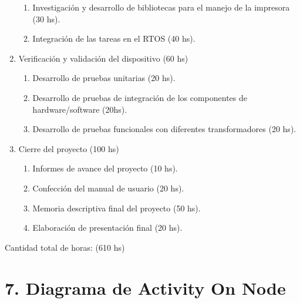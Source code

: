 \documentclass[11pt]{charter}
\begin{document}
\begin{enumerate}
\begin{enumerate}
	\item Investigación y desarrollo de bibliotecas para el manejo de la impresora (30 hs).
	\item Integración de las tareas en el RTOS (40 hs).
	\end{enumerate}
\item Verificación y validación del dispositivo (60 hs)
	\begin{enumerate}
	\item Desarrollo de pruebas unitarias (20 hs).
	\item Desarrollo de pruebas de integración de los componentes de hardware/software (20hs).
	\item Desarrollo de pruebas funcionales con diferentes transformadores (20 hs).
	\end{enumerate}
\item Cierre del proyecto (100 hs)
	\begin{enumerate}
	\item  Informes de avance del proyecto (10 hs).
	\item  Confección del manual de usuario (20 hs).
	\item  Memoria descriptiva final del proyecto (50 hs).
	\item  Elaboración de presentación final (20 hs).
	\end{enumerate}		
\end{enumerate}

Cantidad total de horas: (610 hs)

\newpage

\section{7. Diagrama de Activity On Node}
\label{sec:AoN}
\end{document}
